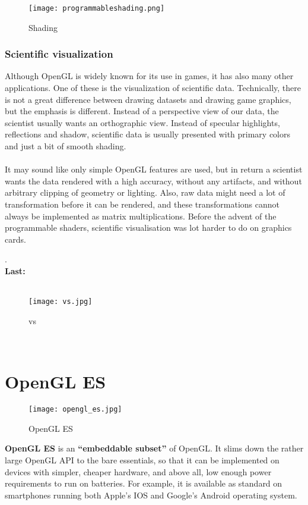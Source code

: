 \documentclass[onecolumn]{article}
\begin{document}
\begin{figure}[ht!]
\centering
\texttt{[image: programmableshading.png]}
\caption{ Shading \label{}}
\end{figure}



\subsubsection{Scientific visualization}\label{sec:2.0.8}

Although OpenGL is widely known for its use in games, it has also many other applications. One of these is the visualization of scientific data. Technically, there is not a great difference between drawing datasets and drawing game graphics, but the emphasis is different. Instead of a perspective view of our data, the scientist usually wants an orthographic view. Instead of specular highlights, reflections and shadow, scientific data is usually presented with primary colors and just a bit of smooth shading. \\\\It may sound like only simple OpenGL features are used, but in return a scientist wants the data rendered with a high accuracy, without any artifacts, and without arbitrary clipping of geometry or lighting. Also, raw data might need a lot of transformation before it can be rendered, and these transformations cannot always be implemented as matrix multiplications. Before the advent of the programmable shaders, scientific visualisation was lot harder to do on graphics cards.


.\\\textbf{Last:}\\\\
\begin{figure}[ht!]
\centering
\texttt{[image: vs.jpg]}
\caption{ vs \label{}}
\end{figure}



\\
\section{OpenGL ES}
\label{sec:4}

\begin{figure}[ht!]
\centering
\texttt{[image: opengl\_es.jpg]}
\caption{OpenGL ES \label{}}
\end{figure}
\begin{story}[OpenGL ES]
\textbf{OpenGL ES }is an \textbf{“embeddable subset”} of OpenGL. It slims down the rather large OpenGL API to the bare essentials, so that it can be implemented on devices with simpler, cheaper hardware, and above all, low enough power requirements to run on batteries. For example, it is available as standard on smartphones running both Apple’s IOS and Google’s Android operating system.
\end{story}
\end{document}
